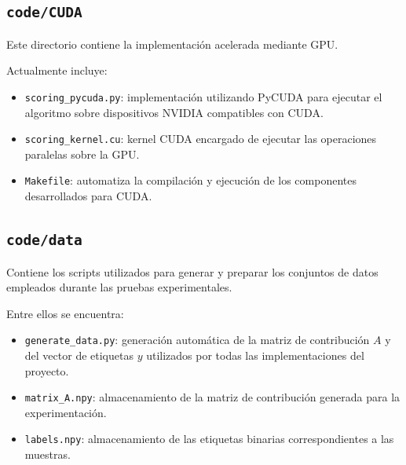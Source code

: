 \subsection{\texttt{code/CUDA}}

Este directorio contiene la implementación acelerada mediante GPU.

Actualmente incluye:

\begin{itemize}

\item \texttt{scoring\_pycuda.py}: implementación utilizando PyCUDA para ejecutar el algoritmo sobre dispositivos NVIDIA compatibles con CUDA.

\item \texttt{scoring\_kernel.cu}: kernel CUDA encargado de ejecutar las operaciones paralelas sobre la GPU.

\item \texttt{Makefile}: automatiza la compilación y ejecución de los componentes desarrollados para CUDA.

\end{itemize}

\subsection{\texttt{code/data}}

Contiene los scripts utilizados para generar y preparar los conjuntos de datos empleados durante las pruebas experimentales.

Entre ellos se encuentra:

\begin{itemize}

\item \texttt{generate\_data.py}: generación automática de la matriz de contribución $A$ y del vector de etiquetas $y$ utilizados por todas las implementaciones del proyecto.

\item \texttt{matrix\_A.npy}: almacenamiento de la matriz de contribución generada para la experimentación.

\item \texttt{labels.npy}: almacenamiento de las etiquetas binarias correspondientes a las muestras.

\end{itemize}

